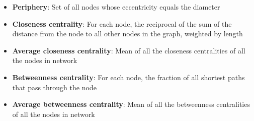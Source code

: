 \documentclass[12pt, letterpaper]{article}
\begin{document}
\begin{itemize}
		\item \textbf{Periphery}: Set of all nodes whose eccentricity equals the diameter
		\item \textbf{Closeness centrality}: For each node, the reciprocal of the sum of the distance from the node to all other nodes in the graph, weighted by length
		\item \textbf{Average closeness centrality}: Mean of all the closeness centralities of all the nodes in network
		\item \textbf{Betweenness centrality}: For each node, the fraction of all shortest paths that pass through the node
		\item \textbf{Average betweenness centrality}: Mean of all the betweenness centralities of all the nodes in network
	\end{itemize}                         
	
	\newpage
	
	
	
\end{document}
